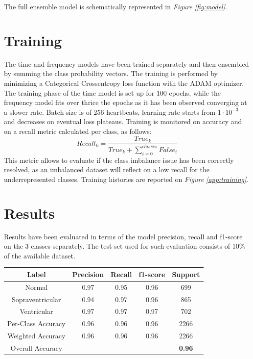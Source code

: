 \documentclass[conference]{IEEEtran}
\newcommand{\fig}[1]{\textit{Figure \ref{#1}}}
\begin{document}
    The full ensemble model is schematically represented in \fig{fig:model}.

\section{Training}
    The time and frequency models have been trained separately and then
    ensembled by summing the class probability vectors. The training is performed by
    minimizing a Categorical Crossentropy loss function with the ADAM optimizer.
    The training phase of
    the time model is set up for 100 epochs, while the frequency model fits over
    thrice the epochs as it has been observed converging at a slower rate. Batch size is
    of 256 heartbeats, learning rate starts from $1\cdot10^{-3}$ and
    decreases on eventual loss plateaus. Training is monitored on accuracy and
    on a recall metric calculated per class, as follows:
    \begin{equation}
        Recall_k=\frac{True_k}{True_k+\sum_{i=0}^{classes}False_i}
    \end{equation}
    This metric allows to evaluate if the class imbalance issue has been
    correctly resolved, as an imbalanced dataset will reflect on a low recall
    for the underrepresented classes.
    Training histories are reported on \fig{app:training}.

\section{Results}
    Results have been evaluated in terms of the model precision, recall and
    f1-score on the 3 classes separately. The test set used for such evaluation
    consists of 10\% of the available dataset.
    
    \begin{center}
        \begin{tabular}{||c|c c c c||}
            \hline
            Label & Precision & Recall & f1-score & Support\\
            \hline \hline
        
            Normal& 0.97&0.95&0.96&699\\
            \hline
            Sopraventricular& 0.94&0.97&0.96&865\\
            \hline
            Ventricular& 0.97&0.97&0.97&702\\
            \hline\hline
        
            Per-Class Accuracy &0.96&0.96&0.96&2266\\
            \hline
            Weighted Accuracy &0.96&0.96&0.96&2266\\
            \hline
            Overall Accuracy&&&&\textbf{0.96}\\
            \hline
        \end{tabular}
    \end{center}
\end{document}
